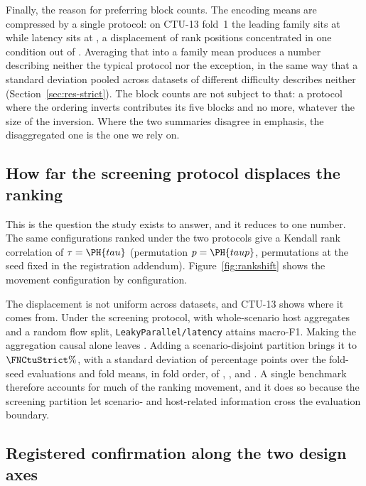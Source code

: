 Finally, the reason for preferring block counts. The encoding means are
compressed by a single protocol: on CTU-13 fold~1 the leading family sits at
 while latency sits at , a displacement of  rank
positions concentrated in one condition out of . Averaging that into a
family mean produces a number describing neither the typical protocol nor the
exception, in the same way that a standard deviation pooled across datasets of
different difficulty describes neither (Section~\ref{sec:res-strict}). The
block counts are not subject to that: a protocol where the ordering inverts
contributes its five blocks and no more, whatever the size of the inversion.
Where the two summaries disagree in emphasis, the disaggregated one is the one
we rely on.

\subsection{How far the screening protocol displaces the ranking}
\label{sec:res-shift}

This is the question the study exists to answer, and it reduces to one number.
The same \FNScrVariants{} configurations ranked under the two protocols give a
Kendall rank correlation of $\tau=\PH{tau}$ (permutation $p=\PH{taup}$,
 permutations at the seed fixed in the registration addendum).
Figure~\ref{fig:rankshift} shows the movement configuration by configuration.


The displacement is not uniform across datasets, and CTU-13 shows where it comes
from. Under the screening protocol, with whole-scenario host aggregates and a
random flow split, \texttt{LeakyParallel/latency} attains \FNCtuLegacy{}
macro-F1. Making the aggregation causal alone leaves \FNCtuCausalRandom.
Adding a scenario-disjoint partition brings it to $\mathbf{\FNCtuStrict\%}$,
with a standard deviation of \FNCtuSdEval{} percentage points over the
\FNCtuNEval{} fold-seed evaluations and fold means, in fold order, of
\FNCtuIdxFA, \FNCtuIdxFB, \FNCtuIdxFC{} and \FNCtuIdxFD. A single benchmark
therefore accounts for much of the ranking movement, and it does so because the
screening partition let scenario- and host-related information cross the
evaluation boundary.

\subsection{Registered confirmation along the two design axes}
\label{sec:res-axes}

